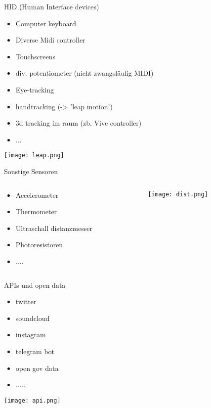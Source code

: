 \begin{frame}{HID (Human Interface devices)}
	\begin{itemize}
		\item Computer keyboard 
		\item Diverse Midi controller
		\item Touchscreens
		\item div. potentiometer (nicht zwangsläufig MIDI)
		\item Eye-tracking
		\item handtracking (-> 'leap motion')
		\item 3d tracking im raum (zb. Vive controller)
		\item ...
	\end{itemize}
\begin{center}
\texttt{[image: leap.png]}
\end{center}

\end{frame}


\begin{frame}{Sonstige Sensoren}

\begin{columns}
	\begin{column}{0.5\textwidth}
		\begin{itemize}
		\item Accelerometer
		\item Thermometer
		\item Ultraschall distanzmesser
		\item Photoresistoren
		\item ....
		\end{itemize}
	\end{column}

	\begin{column}{0.5\textwidth}
		\texttt{[image: dist.png]}
	\end{column}

\end{columns}

\end{frame}

\begin{frame}{APIs und open data}
\begin{itemize}
	\item twitter
	\item soundcloud
	\item instagram
	\item telegram bot
	\item open gov data
	\item .....

\end{itemize}
\begin{center}
\texttt{[image: api.png]}
\end{center}


\end{frame}


